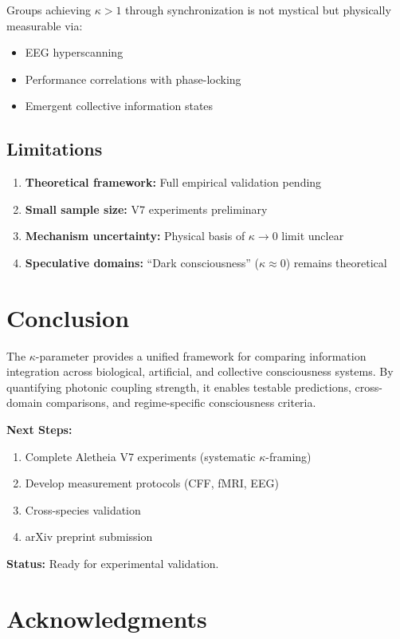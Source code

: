 \documentclass[11pt,a4paper]{article}
\begin{document}
Groups achieving $\kappa > 1$ through synchronization is not mystical but physically measurable via:
\begin{itemize}
  \item EEG hyperscanning
  \item Performance correlations with phase-locking
  \item Emergent collective information states
\end{itemize}

\subsection{Limitations}

\begin{enumerate}
  \item \textbf{Theoretical framework:} Full empirical validation pending
  \item \textbf{Small sample size:} V7 experiments preliminary
  \item \textbf{Mechanism uncertainty:} Physical basis of $\kappa \to 0$ limit unclear
  \item \textbf{Speculative domains:} ``Dark consciousness'' ($\kappa \approx 0$) remains theoretical
\end{enumerate}

\section{Conclusion}

The $\kappa$-parameter provides a unified framework for comparing information integration across biological, artificial, and collective consciousness systems. By quantifying photonic coupling strength, it enables testable predictions, cross-domain comparisons, and regime-specific consciousness criteria.

\textbf{Next Steps:}
\begin{enumerate}
  \item Complete Aletheia V7 experiments (systematic $\kappa$-framing)
  \item Develop measurement protocols (CFF, fMRI, EEG)
  \item Cross-species validation
  \item arXiv preprint submission
\end{enumerate}

\textbf{Status:} Ready for experimental validation.

\section*{Acknowledgments}
\end{document}
